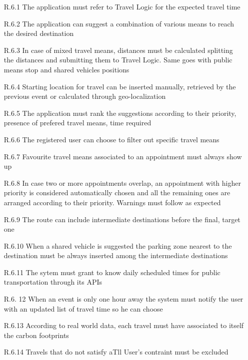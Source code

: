 \begin{itemize}
                  \begin{itemize}
                        \item [R.6.1] The application must refer to Travel Logic for the expected travel time 
                        \item [R.6.2] The application can suggest a combination of various means to reach the desired destination
                        \item [R.6.3] In case of mixed travel means, distances must be calculated splitting the distances and submitting them to Travel Logic. Same goes with public means stop and shared vehicles positions
                        \item [R.6.4] Starting location for travel can be inserted manually, retrieved by the previous event or calculated through geo-localization
                        \item [R.6.5] The application must rank the suggestions according to their priority, presence of prefered travel means, time required
                        \item [R.6.6] The registered user can choose to filter out specific travel means
                        \item [R.6.7] Favourite travel means associated to an appointment must always show up
                        \item [R.6.8] In case two or more appointments overlap, an appointment with higher priority is considered automatically chosen and all the remaining ones are arranged according to their priority. Warnings must follow as expected
                        \item [R.6.9] The route can include intermediate destinations before the final, target one 
                        \item [R.6.10] When a shared vehicle is suggested the parking zone nearest to the destination must be always inserted among the intermediate destinations 
                        \item [R.6.11] The sytem must grant to know daily scheduled times for public transportation through its APIs
                        \item [R.6.	12] When an event is only one hour away the system must notify the user with an updated list of travel time so he can choose
                        \item [R.6.13] According to real world data, each travel must have associated to itself the carbon footprints
                       	\item [R.6.14] Travels that do not satisfy aTll User's contraint must be excluded
                        

\end{itemize}
\end{itemize}

